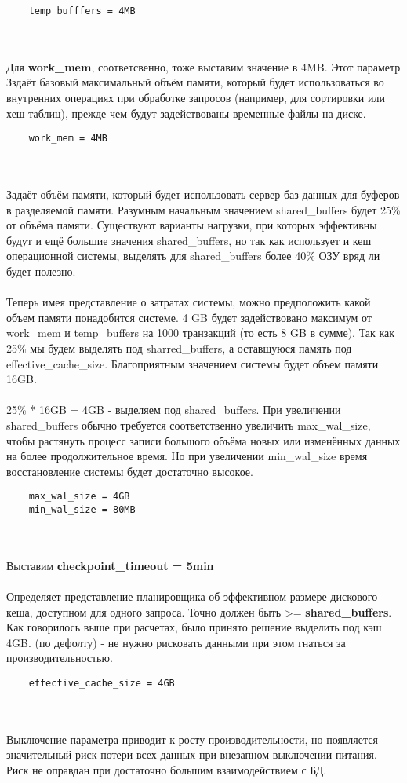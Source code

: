 \documentclass{article}
\begin{document}
\begin{verbatim}
    temp_bufffers = 4MB
\end{verbatim}
\\ \\ 
Для \textbf{work\_mem}, соответсвенно, тоже выставим значение в 4MB.
Этот параметр Зздаёт базовый максимальный объём памяти, который будет использоваться во внутренних операциях при обработке запросов (например, для сортировки или хеш-таблиц), прежде чем будут задействованы временные файлы на диске.
\begin{verbatim}
    work_mem = 4MB
\end{verbatim}
\\ \\
Задаёт объём памяти, который будет использовать сервер баз данных для буферов в разделяемой памяти. Разумным начальным значением shared\_buffers будет 25\% от объёма памяти. Существуют варианты нагрузки, при которых эффективны будут и ещё большие значения shared\_buffers, но так как  использует и кеш операционной системы, выделять для shared\_buffers более 40\% ОЗУ вряд ли будет полезно.
\\ \\ 
Теперь имея представление о затратах  системы, можно предположить какой объем памяти понадобится системе. 4 GB будет задействовано максимум от work\_mem и temp\_buffers на 1000 транзакций (то есть 8 GB в сумме). Так как 25\% мы будем выделять под sharred\_buffers, а оставшуюся память под effective\_cache\_size. Благоприятным значением системы будет объем памяти 16GB.
\\ \\
25\% * 16GB = 4GB - выделяем под shared\_buffers.
При увеличении shared\_buffers обычно требуется соответственно увеличить max\_wal\_size, чтобы растянуть процесс записи большого объёма новых или изменённых данных на более продолжительное время. Но при увеличении min\_wal\_size время восстановление системы будет достаточно высокое.
\begin{verbatim}
    max_wal_size = 4GB
    min_wal_size = 80MB
\end{verbatim}
\\ \\
Выставим \textbf{сheckpoint\_timeout = 5min}	
\\ \\ 
Определяет представление планировщика об эффективном размере дискового кеша, доступном для одного запроса. Точно должен быть >= \textbf{shared\_buffers}. Как говорилось выше при расчетах, было принято решение выделить под кэш 4GB.
 (по дефолту) - не нужно рисковать данными при этом гнаться
за производительностью.
\begin{verbatim}
    effective_cache_size = 4GB
\end{verbatim}
\\ \\ 
Выключение параметра приводит к росту производительности, но появляется значительный риск потери всех данных при внезапном выключении питания. Риск не оправдан при достаточно большим взаимодействием с БД.
\end{document}
